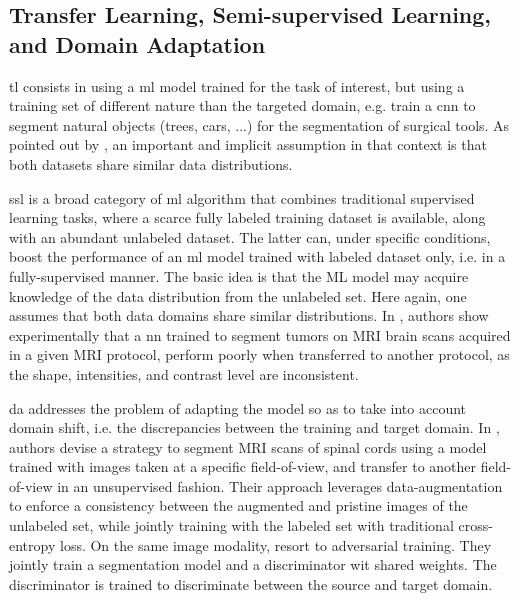 \subsection{Transfer Learning, Semi-supervised Learning, and Domain Adaptation}
\gls{tl} consists in using a \gls{ml} model trained for the task of interest, but using a training set of different nature than the targeted domain, e.g. train a \gls{cnn} to segment natural objects (trees, cars, ...) for the segmentation of surgical tools.
As pointed out by \cite{oliver18}, an important and implicit assumption in that context is that both datasets share similar data distributions.

\gls{ssl} is a broad category of \gls{ml} algorithm that combines traditional supervised learning tasks, where a scarce fully labeled training dataset is available, along with an abundant unlabeled dataset.
The latter can, under specific conditions, boost the performance of an \gls{ml} model trained with labeled dataset only, i.e. in a fully-supervised manner.
The basic idea is that the ML model may acquire knowledge of the data distribution from the unlabeled set.
Here again, one assumes that both data domains share similar distributions.
In \cite{ghafoorian17}, authors show experimentally that a \gls{nn} trained to segment tumors on MRI brain scans acquired in a given MRI protocol, perform poorly when transferred to another protocol, as the shape, intensities, and contrast level are inconsistent.

\gls{da} addresses the problem of adapting the model so as to take into account domain shift, i.e. the discrepancies between the training and target domain.
In \cite{perone19}, authors devise a strategy to segment MRI scans of spinal cords using a model trained with images taken at a specific field-of-view, and transfer to another field-of-view in an unsupervised fashion.
Their approach leverages data-augmentation to enforce a consistency between the augmented and pristine images of the unlabeled set, while jointly training with the labeled set with traditional cross-entropy loss.
On the same image modality, \cite{li20} resort to adversarial training. They jointly train a segmentation model and a discriminator wit shared weights. The discriminator is trained to discriminate between the source and target domain.

